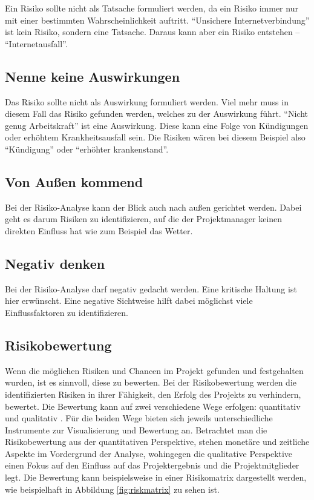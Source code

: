 \documentclass[ThesisDJ.tex]{subfiles}
\begin{document}
Ein Risiko sollte nicht als Tatsache formuliert werden, da ein Risiko immer nur mit einer bestimmten Wahrscheinlichkeit auftritt. “Unsichere Internetverbindung” ist kein Risiko, sondern eine Tatsache. Daraus kann aber ein Risiko entstehen – “Internetausfall”.

\subsection{Nenne keine Auswirkungen}

Das Risiko sollte nicht als Auswirkung formuliert werden. Viel mehr muss in diesem Fall das Risiko gefunden werden, welches zu der Auswirkung führt. “Nicht genug  Arbeitskraft” ist eine Auswirkung. Diese kann eine Folge von Kündigungen oder erhöhtem Krankheitsausfall sein. Die Risiken wären bei diesem Beispiel also “Kündigung” oder “erhöhter krankenstand”.


\subsection{Von Außen kommend}

Bei der Risiko-Analyse kann der Blick auch nach außen gerichtet werden. Dabei geht es darum Risiken zu identifizieren, auf die der Projektmanager keinen direkten Einfluss hat wie zum Beispiel das Wetter. 

\subsection{Negativ denken}

Bei der Risiko-Analyse darf negativ gedacht werden. Eine kritische Haltung ist hier erwünscht. Eine negative Sichtweise hilft dabei möglichst viele Einflussfaktoren zu identifizieren.


\subsection{Risikobewertung}
Wenn die möglichen Risiken und Chancen im Projekt gefunden und festgehalten wurden, ist es sinnvoll, diese zu bewerten. Bei der Risikobewertung werden die identifizierten Risiken in ihrer Fähigkeit, den Erfolg des Projekts zu verhindern, bewertet. Die Bewertung kann auf zwei verschiedene Wege erfolgen: quantitativ und qualitativ \cite[S.~300 ff.]{patzak2017projektmanagement}. Für die beiden Wege bieten sich jeweils unterschiedliche Instrumente zur Visualisierung und Bewertung an. Betrachtet man die Risikobewertung aus der quantitativen Perspektive, stehen monetäre und zeitliche Aspekte im Vordergrund der Analyse, wohingegen die qualitative Perspektive einen Fokus auf den Einfluss auf das Projektergebnis und die Projektmitglieder legt. Die Bewertung kann beispielsweise in einer Risikomatrix dargestellt werden, wie beispielhaft in Abbildung \ref{fig:riskmatrix}\cite[S.~24]{cicek2022risikomanagement} zu sehen ist.
\end{document}
